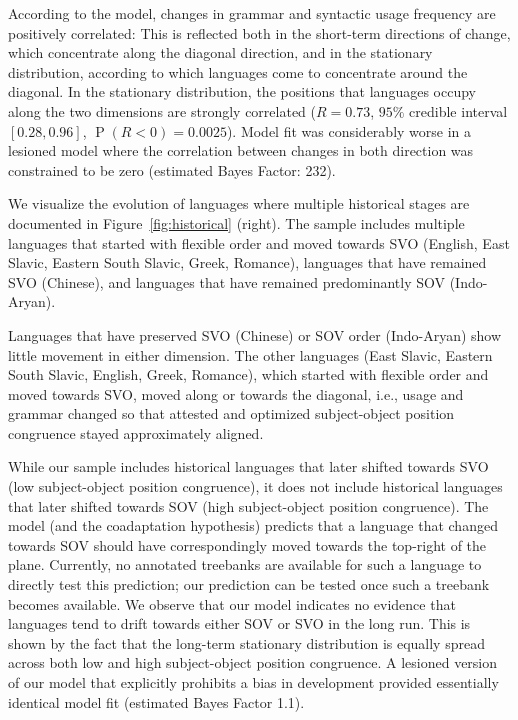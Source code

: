 \documentclass[9pt,twocolumn,twoside,lineno]{pnas-new}
\begin{document}
According to the model, changes in grammar and syntactic usage frequency are positively correlated:
This is reflected both in the short-term directions of change, which concentrate along the diagonal direction, and in the stationary distribution, according to which languages come to concentrate around the diagonal.
In the stationary distribution, the positions that languages occupy along the two dimensions are strongly correlated ($R=0.73$, $95\%$ credible interval $[0.28, 0.96]$, $\operatorname{P}(R<0) = 0.0025$). %
Model fit was considerably worse in a lesioned model where the correlation between changes in both direction was constrained to be zero (estimated Bayes Factor: 232). %



We visualize the evolution of languages where multiple historical stages are documented in Figure~\ref{fig:historical} (right).
The sample includes multiple languages that started with flexible order and moved towards SVO (English, East Slavic, Eastern South Slavic, Greek, Romance), languages that have remained SVO (Chinese), and languages that have remained predominantly SOV (Indo-Aryan).

Languages that have preserved SVO (Chinese) or SOV order (Indo-Aryan) show little movement in either dimension.
The other languages (East Slavic, Eastern South Slavic, English, Greek, Romance), which started with flexible order and moved towards SVO, moved along or towards the diagonal, i.e., usage and grammar changed so that attested and optimized subject-object position congruence stayed approximately aligned.


While our sample includes historical languages that later shifted towards SVO (low subject-object position congruence), it does not include historical languages that later shifted towards SOV (high subject-object position congruence).
The model (and the coadaptation hypothesis) predicts that a language that changed towards SOV should have correspondingly moved towards the top-right of the plane. 
Currently, no annotated treebanks are available for such a language to directly test this prediction; our prediction can be tested once such a treebank becomes available.
We observe that our model indicates no evidence that languages tend to drift towards either SOV or SVO in the long run.
This is shown by the fact that the long-term stationary distribution is equally spread across both low and high subject-object position congruence.
A lesioned version of our model that explicitly prohibits a bias in development provided essentially identical model fit (estimated Bayes Factor 1.1).
\end{document}
